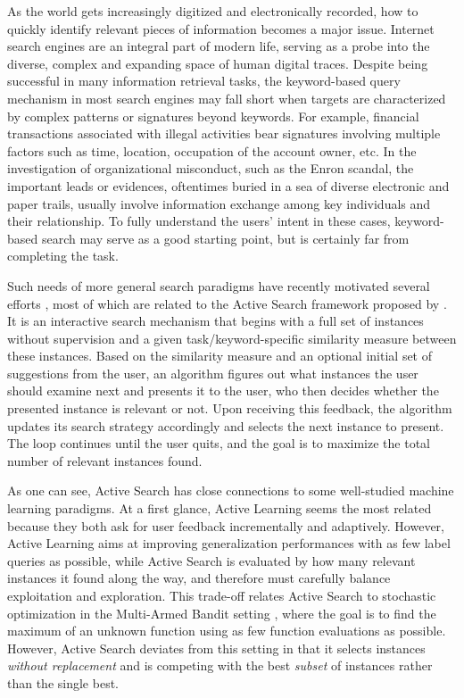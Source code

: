 As the world gets increasingly digitized and electronically recorded, how to quickly identify relevant pieces of information becomes a major issue.
Internet search engines are an integral part of modern life, serving as a probe into the diverse, complex and expanding space of human digital traces.
Despite being successful in many information retrieval tasks, the keyword-based query mechanism in most search engines 
may fall short when targets are characterized by complex patterns or signatures beyond keywords. For example, financial transactions associated with illegal activities 
bear signatures involving multiple factors such as time, location, occupation of the account owner, etc. In the investigation of organizational misconduct, such as the 
Enron scandal, the important leads or evidences, oftentimes buried in a sea of diverse electronic and paper trails, usually involve information exchange among key 
individuals and their relationship. To fully understand the users' intent in these cases, keyword-based search may serve as a good starting point, but is certainly far from completing the task.

Such needs of more general search paradigms have recently motivated several efforts \cite{roman,wang2013active,vanchinathanadaptively}, most of which
are related to the Active Search framework proposed by \cite{roman}. 
It is an interactive search mechanism that begins with a full set of instances without supervision and a given task/keyword-specific similarity measure between these instances. 
Based on the similarity measure and an optional initial set of suggestions from the user, an algorithm figures out what instances the user should examine next and presents it to the user, who then decides whether the presented instance is relevant or not.
Upon receiving this feedback, the algorithm updates its search strategy accordingly and selects the next instance to present.
The loop continues until the user quits, and the goal is to maximize the total number of relevant instances found.

As one can see, Active Search has close connections to some well-studied machine learning paradigms. 
At a first glance, Active Learning \citep{settles2010active} seems the most related because they both ask for user feedback incrementally and adaptively. 
However, Active Learning aims at improving generalization performances with as few label queries as possible, 
while Active Search is evaluated by how many relevant instances it found along the way, and therefore must carefully balance exploitation and exploration. 
This trade-off relates Active Search to stochastic optimization in the Multi-Armed Bandit setting 
\citep{robbins1985some,dani2008stochastic,kleinberg2008multi,bubeck2009online}, where the goal is 
to find the maximum of an unknown function using as few function evaluations as possible. However, 
Active Search deviates from this setting in that it selects instances \textit{without replacement} 
and is competing with the best \textit{subset} of instances rather than the single best.  

